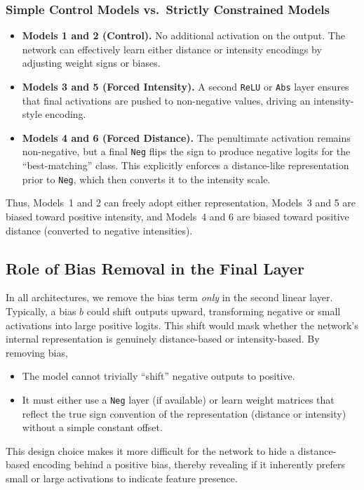\subsubsection{Simple Control Models vs.\ Strictly Constrained Models}
\begin{itemize}
    \item \textbf{Models 1 and 2 (Control).} No additional activation on the output. The network can effectively learn either distance or intensity encodings by adjusting weight signs or biases.
    \item \textbf{Models 3 and 5 (Forced Intensity).} A second \texttt{ReLU} or \texttt{Abs} layer ensures that final activations are pushed to non-negative values, driving an intensity-style encoding.
    \item \textbf{Models 4 and 6 (Forced Distance).} The penultimate activation remains non-negative, but a final \texttt{Neg} flips the sign to produce negative logits for the ``best-matching'' class. This explicitly enforces a distance-like representation prior to \texttt{Neg}, which then converts it to the intensity scale.
\end{itemize}

\noindent
Thus, Models~1 and 2 can freely adopt either representation, Models~3 and 5 are biased toward positive intensity, and Models~4 and 6 are biased toward positive distance (converted to negative intensities).

\subsection{Role of Bias Removal in the Final Layer}
In all architectures, we remove the bias term \emph{only} in the second linear layer. Typically, a bias \(b\) could shift outputs upward, transforming negative or small activations into large positive logits. This shift would mask whether the network's internal representation is genuinely distance-based or intensity-based. By removing bias,
\begin{itemize}
    \item The model cannot trivially ``shift'' negative outputs to positive.
    \item It must either use a \texttt{Neg} layer (if available) or learn weight matrices that reflect the true sign convention of the representation (distance or intensity) without a simple constant offset.
\end{itemize}
This design choice makes it more difficult for the network to hide a distance-based encoding behind a positive bias, thereby revealing if it inherently prefers small or large activations to indicate feature presence.

